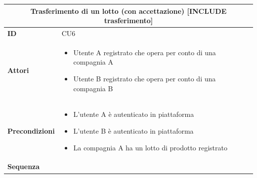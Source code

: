 \documentclass[a4paper,11pt]{article}
\begin{document}
\begin{longtable}{|m{2cm}|m{10.5cm}|}
  \multicolumn{2}{c}{\textbf{Trasferimento di un lotto (con accettazione) [INCLUDE trasferimento]}} \\ \hline
  \textbf{ID}              & CU6                                                                    \\ \hline
  \textbf{Attori}          &

  \begin{itemize}
    \item Utente A registrato che opera per conto di una compagnia A
    \item Utente B registrato che opera per conto di una compagnia B
  \end{itemize}

  \\ \hline
  \textbf{Precondizioni}   &

  \begin{itemize}
    \item L'utente A è autenticato in piattaforma
    \item L'utente B è autenticato in piattaforma
    \item La compagnia A ha un lotto di prodotto registrato
  \end{itemize}

  \\ \hline
  \textbf{Sequenza}        &


\end{longtable}
\end{document}
